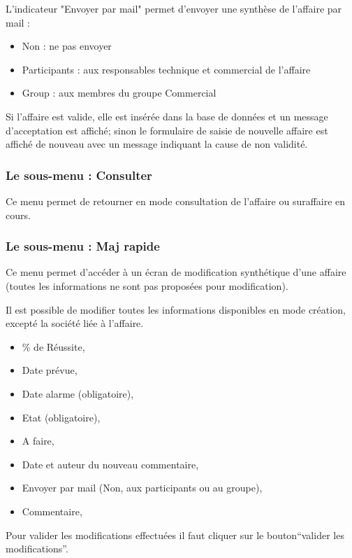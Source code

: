 L'indicateur "Envoyer par mail" permet d'envoyer une synthèse de l'affaire par mail :
\begin{itemize}
\item Non : ne pas envoyer
\item Participants : aux responsables technique et commercial de l'affaire
\item Group : aux membres du  groupe Commercial
\end{itemize}
\vspace{0.3cm}

Si l'affaire est valide, elle est insérée dans la base de données et un message d'acceptation est affiché; sinon le formulaire de saisie de nouvelle affaire est affiché de nouveau avec un message indiquant la cause de non validité.


\subsubsection{Le sous-menu : Consulter}

Ce menu permet de retourner en mode consultation de l'affaire ou suraffaire en cours.


\subsubsection{Le sous-menu : Maj rapide}

Ce menu permet d'accéder à un écran de modification synthétique d'une affaire (toutes les informations ne sont pas proposées pour modification).

Il est possible de modifier toutes les informations disponibles en mode création, excepté la société liée à l'affaire.

\begin{itemize}
\item \% de Réussite,
\item Date prévue,
\item Date alarme (obligatoire),
\item Etat (obligatoire),
\item A faire,
\item Date et auteur du nouveau commentaire,
\item Envoyer par mail (Non, aux participants ou au groupe),
\item Commentaire,
\end{itemize}
\vspace{0.3cm}

Pour valider les modifications effectuées il faut cliquer sur le bouton``valider les modifications''.


